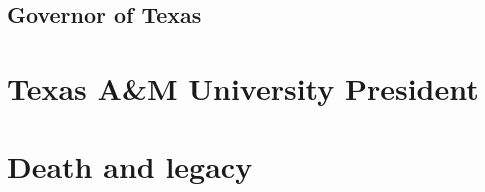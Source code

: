 \documentclass[12pt]{article}
\begin{document}
\subsection{Governor of Texas}

\newpage
\section{Texas A\&M University President}

\newpage
\section{Death and legacy}

\newpage
\printbibliography

\end{document}
